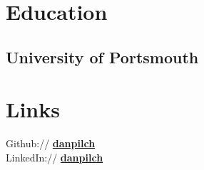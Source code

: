 \documentclass[]{resume}
\begin{document}
\begin{minipage}[t]{0.33\textwidth}

\section{Education}

\subsection{University of Portsmouth}
\sectionsep





\section{Links}
Github:// \href{https://github.com/danpilch}{\bf danpilch} \\
LinkedIn://  \href{https://www.linkedin.com/in/danpilch}{\bf danpilch}
\sectionsep

\end{minipage}
\end{document}
